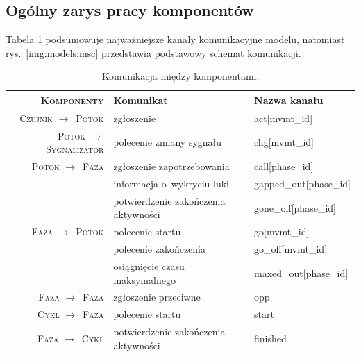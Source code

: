 \documentclass{pracamgr}
\newcommand{\imgr}[1]{rys.~\ref{#1}}
\newcommand{\rarr}{$\rightarrow$}
\theoremstyle{plain}
\begin{document}
\subsection{Ogólny zarys pracy komponentów}
\label{ss:models:models:summary}

Tabela \ref{tab:models:channels} podsumowuje najważniejsze kanały
komunikacyjne modelu, natomiast \imgr{img:models:msc} przedstawia
podstawowy schemat komunikacji.

\renewcommand{\arraystretch}{1.4}
\begin{table}
  \centering
  \begin{tabular}{>{\scshape}r|p{}|>{\ttfamily}p{}}
    \firsthline\firsthline
    \textbf{Komponenty} & \textbf{Komunikat} & \textnormal{\bfseries Nazwa kanału} \\ \hline
    Czujnik \rarr\ Potok & zgłoszenie & act[mvmt\_id] \\ \hline
    Potok \rarr\ Sygnalizator & polecenie zmiany sygnału & chg[mvmt\_id]
    \\ \hline
    Potok \rarr\ Faza & zgłoszenie zapotrzebowania & call[phase\_id] \\
                      & informacja o~wykryciu luki & gapped\_out[phase\_id] \\
                      & potwierdzenie zakończenia aktywności & gone\_off[phase\_id]
    \\ \hline
    Faza \rarr\ Potok & polecenie startu & go[mvmt\_id] \\
                      & polecenie zakończenia & go\_off[mvmt\_id] \\
                      & osiągnięcie czasu maksymalnego & maxed\_out[phase\_id]
    \\ \hline
    Faza \rarr\ Faza & zgłoszenie przeciwne & opp
    \\ \hline
    Cykl \rarr\ Faza & polecenie startu & start \\ \hline
    Faza \rarr\ Cykl & potwierdzenie zakończenia aktywności & finished \\
    \hline\hline
  \end{tabular}
  \caption{Komunikacja między komponentami.}
  \label{tab:models:channels}
\end{table}
\end{document}
